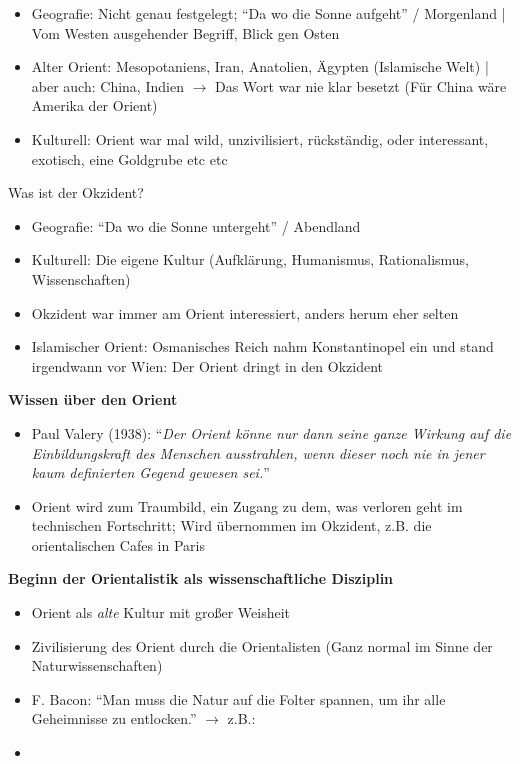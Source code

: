 \documentclass[emulatestandardclasses]{scrartcl}
\begin{document}
\begin{itemize}
  \item Geografie: Nicht genau festgelegt; "`Da wo die Sonne aufgeht"' / Morgenland | Vom Westen ausgehender Begriff, Blick gen Osten
  \item Alter Orient: Mesopotaniens, Iran, Anatolien, Ägypten (Islamische Welt) | aber auch: China, Indien $\rightarrow$ Das Wort war nie klar besetzt (Für China wäre Amerika der Orient)
  \item Kulturell: Orient war mal wild, unzivilisiert, rückständig, oder interessant, exotisch, eine Goldgrube etc etc
\end{itemize}

Was ist der Okzident?

\begin{itemize}
  \item Geografie: "`Da wo die Sonne untergeht"' / Abendland
  \item Kulturell: Die eigene Kultur (Aufklärung, Humanismus, Rationalismus, Wissenschaften)
  \item Okzident war immer am Orient interessiert, anders herum eher selten
  \item Islamischer Orient: Osmanisches Reich nahm Konstantinopel ein und stand irgendwann vor Wien: Der Orient dringt in den Okzident
\end{itemize}

\textbf{Wissen über den Orient}

\begin{itemize}
  \item Paul Valery (1938): "`\emph{Der Orient könne nur dann seine ganze Wirkung auf die Einbildungskraft des Menschen ausstrahlen, wenn dieser noch nie in jener kaum definierten Gegend gewesen sei.}"'
  \item Orient wird zum Traumbild, ein Zugang zu dem, was verloren geht im technischen Fortschritt; Wird übernommen im Okzident, z.B. die orientalischen Cafes in Paris
\end{itemize}

\textbf{Beginn der Orientalistik als wissenschaftliche Disziplin}

\begin{itemize}
  \item Orient als \emph{alte} Kultur mit großer Weisheit
  \item Zivilisierung des Orient durch die Orientalisten (Ganz normal im Sinne der Naturwissenschaften)
  \item F. Bacon: "`Man muss die Natur auf die Folter spannen, um ihr alle Geheimnisse zu entlocken."' $\rightarrow$ z.B.: 
  \item 
\end{itemize}


\newpage
\end{document}
